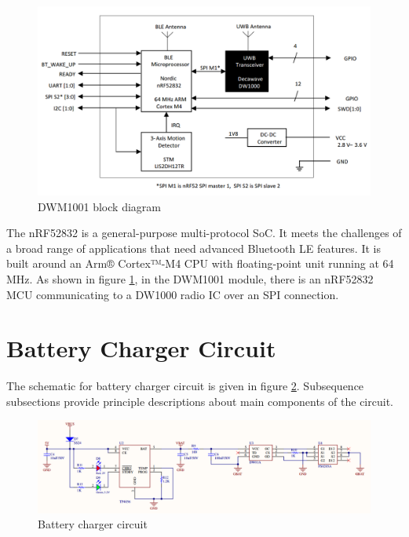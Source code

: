 \documentclass[\main/thesis.tex]{subfiles}
\begin{document}
\begin{figure}[H]
    \begin{center}
        \includegraphics[scale=0.3]{dwm1001_block_diagram.png}
    \end{center}
    \caption{DWM1001 block diagram}
    \label{fig:dwm1001_block_diagram}
\end{figure}

The nRF52832 is a general-purpose multi-protocol SoC. It meets the challenges of a broad range of applications that need advanced Bluetooth LE features. It is built around an Arm® Cortex™-M4 CPU with floating-point unit running at 64 MHz. As shown in figure \ref{fig:dwm1001_block_diagram}, in the DWM1001 module, there is an nRF52832 MCU communicating to  a DW1000 radio IC over an SPI connection.

\section{Battery Charger Circuit}
The schematic for battery charger circuit is given in figure \ref{fig:battery_charger_circuit}. Subsequence subsections provide principle descriptions about main components of the circuit.
\begin{figure}[H]
    \begin{center}
        \includegraphics[width=1\textwidth]{battery_charger_circuit.png}
    \end{center}
    \caption{Battery charger circuit}
    \label{fig:battery_charger_circuit}
\end{figure}
\end{document}
